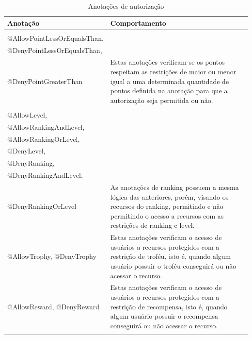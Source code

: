 \begin{longtable}{|l|m{10cm}|}
\hline
Anotação & Comportamento \\ \hline
\endfirsthead
\endhead
\begin{tabular}[c]{@{}l@{}}
@AllowPointGreaterThan, \\ @AllowPointLessOrEqualsThan, \\ @DenyPointLessOrEqualsThan, \\ @DenyPointGreaterThan
\end{tabular} & Estas anotações verificam se os pontos respeitam as restrições de maior ou menor igual a uma determinada quantidade de pontos definida na anotação para que a autorização seja permitida ou não. \\ \hline
\begin{tabular}[c]{@{}l@{}}
@AllowRanking, \\
@AllowLevel, \\ 
@AllowRankingAndLevel, \\
@AllowRankingOrLevel, \\ 
@DenyLevel, \\
@DenyRanking, \\ 
@DenyRankingAndLevel, \\
@DenyRankingOrLevel
\end{tabular} & As anotações de ranking possuem a mesma lógica das anteriores, porém, visando os recursos do ranking, permitindo e não permitindo o acesso a recursos com as restrições de ranking e level. \\ \hline
@AllowTrophy, @DenyTrophy & Estas anotações verificam o acesso de usuários a recursos protegidos com a restrição de troféu, isto é, quando algum usuário possuir o troféu conseguirá ou não acessar o recurso. \\ \hline
@AllowReward, @DenyReward & Estas anotações verificam o acesso de usuários a recursos protegidos com a restrição de recompensa, isto é, quando algum usuário possuir o recompensa conseguirá ou não acessar o recurso. \\ \hline
\caption{Anotações de autorização}
\label{tab:autorizacoes}\\
\end{longtable}
